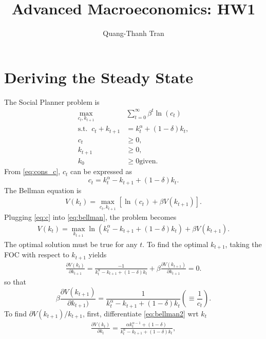 \documentclass[10pt,a4paper]{article}
\author{Quang-Thanh Tran}
\title{Advanced Macroeconomics: HW1}
\begin{document}
\maketitle
\section{Deriving the Steady State}
	The Social Planner problem is
	\begin{align}
		\max_{c_t, k_{t+1}} &\sum^{\infty}_{t=0} \beta^t \ln(c_t) \\
		\text{s.t. } \  \label{eq:cons_c} c_t + k_{t+1} &= k_t^\alpha + (1-\delta)k_t, \\
		c_t &\geq 0, \nonumber \\
		k_{t+1} &\geq 0, \nonumber \\
		k_0 &\geq 0 \nonumber \text{given}.
	\end{align}
From \eqref{eq:cons_c}, $c_t$ can be expressed as
\begin{equation}
	\label{eq:c} c_t = k_t^\alpha - k_{t+1} + (1-\delta)k_t.
\end{equation}
The Bellman equation is
\begin{align}
	\label{eq:bellman} V(k_t) = \max_{c_t, k_{t+1}} \left[ \ln(c_t) + \beta V(k_{t+1}) \right].
\end{align}
Plugging \eqref{eq:c} into \eqref{eq:bellman}, the problem becomes
\begin{align}
	\label{eq:bellman2} V(k_t) = \max_{k_{t+1}} \ln(k_t^\alpha - k_{t+1} + (1-\delta)k_t) + \beta V(k_{t+1}).
\end{align}
The optimal solution must be true for any $t$. To find the optimal $k_{t+1}$, taking the FOC with respect to $k_{t+1}$ yields
\begin{align}
	\frac{\partial V(k_t)}{\partial k_{t+1}} = \frac{-1}{k_t^\alpha - k_{t+1} + (1-\delta)k_t} + \beta \frac{\partial V(k_{t+1})}{\partial k_{t+1}} = 0. \nonumber
\end{align}
so that
\begin{equation}
	\label{eq:preeuler} \beta \frac{\partial V(k_{t+1})}{\partial k_{t+1})} = \frac{1}{k_t^\alpha - k_{t+1} + (1-\delta)k_t} \left(\equiv \frac{1}{c_t} \right).
\end{equation}
To find $\partial V(k_{t+1})/ k_{t+1}$, first, differentiate \eqref{eq:bellman2} wrt $k_t$ 
\begin{align}
	\frac{\partial V(k_t)}{\partial k_t} = \frac{\alpha k_t^{\alpha-1} + (1-\delta)}{k_t^\alpha - k_{t+1} + (1-\delta)k_t},
\end{align}
\end{document}
